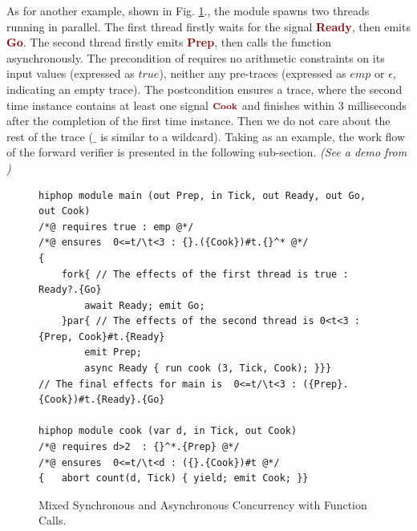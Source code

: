 \documentclass[acmsmall,10pt,review]{acmart}
\newcommand{\anyevent}[1]{{\textcolor{darkred}
{{\textbf{\footnotesize #1}}}}}
\newcommand{\code}[1]{{\tt{\ensuremath{\m{#1}}}}}
\newcommand{\m}{\mathit}
\newcommand\figref[1]{Fig. \textcolor{black}{\ref{#1}}.}
\begin{document}
As for another example, shown in \figref{fig:overview_eg2}, the module {} %
spawns two threads running in  parallel.
The first thread firstly waits for the signal \anyevent{Ready}, then emits  \anyevent{Go}. 
The second thread firstly emits  \anyevent{Prep}, then calls the function {} asynchronously. 
The precondition of {} requires no arithmetic constraints on its input values (expressed as \code{\m{true}}), neither any pre-traces  (expressed as \code{\m{emp}} or \code{\epsilon}, indicating an empty trace). The postcondition ensures a trace, where the second time instance contains at least one signal \code{\anyevent{Cook}} and finishes within 3 milliseconds after the completion of the first time instance. Then we do not care about the rest of the trace (\code{\_} is similar to a wildcard). 
Taking {} as an example, the work flow of the forward verifier is presented in the following sub-section. \emph{(See a demo from \cite{CODE2})}

\begin{figure}[ht]
      \vspace{-2mm}
\begin{lstlisting}[columns=fullflexible]
hiphop module main (out Prep, in Tick, out Ready, out Go, out Cook)
/*@ requires true : emp @*/
/*@ ensures  0<=t/\t<3 : {}.({Cook})#t.{}^* @*/
{
	fork{ // The effects of the first thread is true : Ready?.{Go}
		await Ready; emit Go; 
	}par{ // The effects of the second thread is 0<t<3 : {Prep, Cook}#t.{Ready}
		emit Prep;
		async Ready { run cook (3, Tick, Cook); }}}
// The final effects for main is  0<=t/\t<3 : ({Prep}.{Cook})#t.{Ready}.{Go} 
      
hiphop module cook (var d, in Tick, out Cook)
/*@ requires d>2  : {}^*.{Prep} @*/
/*@ ensures  0<=t/\t<d : ({}.{Cook})#t @*/
{	abort count(d, Tick) { yield; emit Cook; }}
\end{lstlisting}  
      \vspace{-1mm}
      \caption{Mixed Synchronous and Asynchronous Concurrency with Function Calls.}\label{fig:overview_eg2}
            \vspace{-1mm}
\end{figure}


\end{document}

